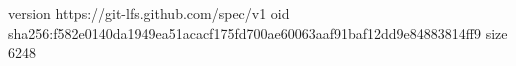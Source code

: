 version https://git-lfs.github.com/spec/v1
oid sha256:f582e0140da1949ea51acacf175fd700ae60063aaf91baf12dd9e84883814ff9
size 6248
